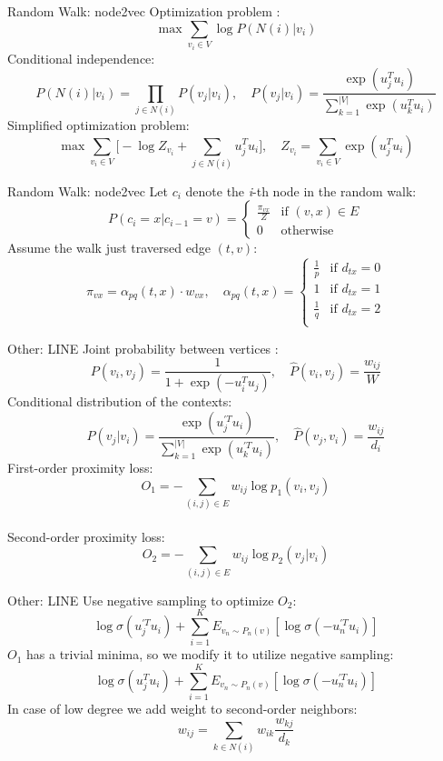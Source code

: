 \documentclass[10pt,aspectratio=169]{beamer}
\begin{document}
\begin{frame}[fragile]{Random Walk: node2vec}
  Optimization problem \cite{grover2016node2vec}: $$\max \sum_{v_i \in V} \log P(N(i)|v_i)$$
  Conditional independence: $$P(N(i)|v_i)=\prod_{j\in N(i)} P(v_j|v_i), \quad
    P(v_j|v_i)=\frac{\exp(u_j^{T}u_i)}{\sum_{k=1}^{|V|} \exp(u_k^{T}u_i)}$$
  \pause
  Simplified optimization problem: $$\max \sum_{v_i \in V} \Big[ -\log{Z_{v_i}} +
    \sum_{j \in N(i)} u_j^Tu_i \Big], \quad Z_{v_i}=\sum_{v_i \in V} \exp(u_j^Tu_i)$$
\end{frame}

\begin{frame}[fragile]{Random Walk: node2vec}
  Let $c_i$ denote the \textit{i}-th node in the random walk: $$P(c_i=x|c_{i-1}=v)=
    \begin{cases}
      \frac{\pi_{vx}}{Z} & \text{if } (v,x) \in E \\
      0 & \text{otherwise}
    \end{cases}$$
  Assume the walk just traversed edge $(t,v)$:
    $$\pi_{vx}=\alpha_{pq}(t,x)\cdot w_{vx}, \quad \alpha_{pq}(t,x)=
    \begin{cases}
      \frac{1}{p} & \text{if } d_{tx}=0\\
      1 & \text{if } d_{tx}=1\\
      \frac{1}{q} & \text{if } d_{tx}=2\\
    \end{cases}$$
\end{frame}

\begin{frame}[fragile]{Other: LINE}
  Joint probability between vertices \cite{2015arXiv150303578T}:
    $$P(v_i,v_j)=\frac{1}{1+\exp(-u_i^Tu_j)}, \quad \hat{P}(v_i,v_j)=\frac{w_{ij}}{W}$$
  Conditional distribution of the contexts:
    $$P(v_j|v_i)=\frac{\exp(u_j^{'T}u_i)}{\sum_{k=1}^{|V|} \exp(u_k^{'T}u_i)}, \quad \hat{P}(v_j,v_i)=\frac{w_{ij}}{d_i}$$
  \pause
  First-order proximity loss: $$O_1=-\sum_{(i,j)\in E} w_{ij} \log p_1(v_i,v_j)$$\\[2mm]
  Second-order proximity loss: $$O_2=-\sum_{(i,j)\in E} w_{ij} \log p_2(v_j|v_i)$$
\end{frame}

\begin{frame}[fragile]{Other: LINE}
  Use negative sampling to optimize $O_2$:
    $$\log \sigma(u_j^{'T}u_i)+\sum_{i=1}^K E_{v_n \sim P_n(v)}[\log \sigma(-u_n^{'T}u_i)]$$
  $O_1$ has a trivial minima, so we modify it to utilize negative sampling:
    $$\log \sigma(u_j^Tu_i)+\sum_{i=1}^K E_{v_n \sim P_n(v)}[\log \sigma(-u_n^{'T}u_i)]$$
  \pause
  In case of low degree we add weight to second-order neighbors:
    $$w_{ij}=\sum_{k \in N(i)} w_{ik} \frac{w_{kj}}{d_k}$$
\end{frame}
\end{document}
